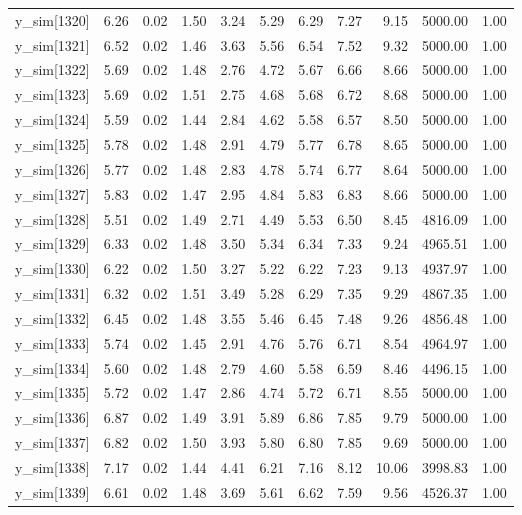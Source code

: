 \begin{table}[ht]
\begin{tabular}{rrrrrrrrrrr}
  y\_sim[1320] & 6.26 & 0.02 & 1.50 & 3.24 & 5.29 & 6.29 & 7.27 & 9.15 & 5000.00 & 1.00 \\ 
  y\_sim[1321] & 6.52 & 0.02 & 1.46 & 3.63 & 5.56 & 6.54 & 7.52 & 9.32 & 5000.00 & 1.00 \\ 
  y\_sim[1322] & 5.69 & 0.02 & 1.48 & 2.76 & 4.72 & 5.67 & 6.66 & 8.66 & 5000.00 & 1.00 \\ 
  y\_sim[1323] & 5.69 & 0.02 & 1.51 & 2.75 & 4.68 & 5.68 & 6.72 & 8.68 & 5000.00 & 1.00 \\ 
  y\_sim[1324] & 5.59 & 0.02 & 1.44 & 2.84 & 4.62 & 5.58 & 6.57 & 8.50 & 5000.00 & 1.00 \\ 
  y\_sim[1325] & 5.78 & 0.02 & 1.48 & 2.91 & 4.79 & 5.77 & 6.78 & 8.65 & 5000.00 & 1.00 \\ 
  y\_sim[1326] & 5.77 & 0.02 & 1.48 & 2.83 & 4.78 & 5.74 & 6.77 & 8.64 & 5000.00 & 1.00 \\ 
  y\_sim[1327] & 5.83 & 0.02 & 1.47 & 2.95 & 4.84 & 5.83 & 6.83 & 8.66 & 5000.00 & 1.00 \\ 
  y\_sim[1328] & 5.51 & 0.02 & 1.49 & 2.71 & 4.49 & 5.53 & 6.50 & 8.45 & 4816.09 & 1.00 \\ 
  y\_sim[1329] & 6.33 & 0.02 & 1.48 & 3.50 & 5.34 & 6.34 & 7.33 & 9.24 & 4965.51 & 1.00 \\ 
  y\_sim[1330] & 6.22 & 0.02 & 1.50 & 3.27 & 5.22 & 6.22 & 7.23 & 9.13 & 4937.97 & 1.00 \\ 
  y\_sim[1331] & 6.32 & 0.02 & 1.51 & 3.49 & 5.28 & 6.29 & 7.35 & 9.29 & 4867.35 & 1.00 \\ 
  y\_sim[1332] & 6.45 & 0.02 & 1.48 & 3.55 & 5.46 & 6.45 & 7.48 & 9.26 & 4856.48 & 1.00 \\ 
  y\_sim[1333] & 5.74 & 0.02 & 1.45 & 2.91 & 4.76 & 5.76 & 6.71 & 8.54 & 4964.97 & 1.00 \\ 
  y\_sim[1334] & 5.60 & 0.02 & 1.48 & 2.79 & 4.60 & 5.58 & 6.59 & 8.46 & 4496.15 & 1.00 \\ 
  y\_sim[1335] & 5.72 & 0.02 & 1.47 & 2.86 & 4.74 & 5.72 & 6.71 & 8.55 & 5000.00 & 1.00 \\ 
  y\_sim[1336] & 6.87 & 0.02 & 1.49 & 3.91 & 5.89 & 6.86 & 7.85 & 9.79 & 5000.00 & 1.00 \\ 
  y\_sim[1337] & 6.82 & 0.02 & 1.50 & 3.93 & 5.80 & 6.80 & 7.85 & 9.69 & 5000.00 & 1.00 \\ 
  y\_sim[1338] & 7.17 & 0.02 & 1.44 & 4.41 & 6.21 & 7.16 & 8.12 & 10.06 & 3998.83 & 1.00 \\ 
  y\_sim[1339] & 6.61 & 0.02 & 1.48 & 3.69 & 5.61 & 6.62 & 7.59 & 9.56 & 4526.37 & 1.00 \\ 

\end{tabular}
\end{table}
